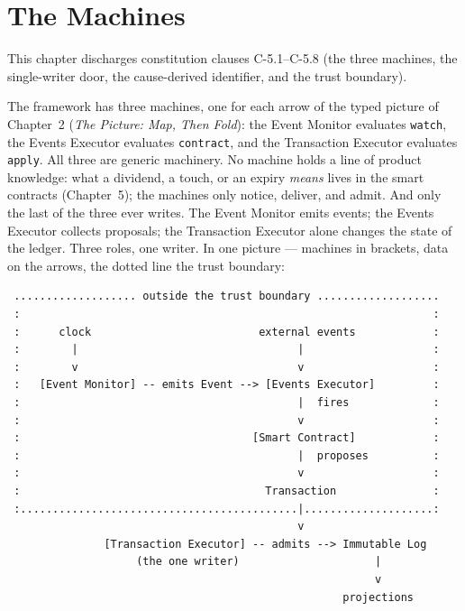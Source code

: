 \section{The Machines}\label{ch:machines}

This chapter discharges constitution clauses C-5.1--C-5.8 (the three machines, the single-writer door, the cause-derived identifier, and the trust boundary).

The framework has three machines, one for each arrow of the typed picture of
Chapter~2 (\emph{The Picture: Map, Then Fold}): the Event Monitor evaluates
\texttt{watch}, the Events Executor evaluates \texttt{contract}, and the
Transaction Executor evaluates \texttt{apply}. All three are generic machinery.
No machine holds a line of product knowledge: what a dividend, a touch, or an
expiry \emph{means} lives in the smart contracts (Chapter~5); the machines only
notice, deliver, and admit. And only the last of the three ever writes. The
Event Monitor emits events; the Events Executor collects proposals; the
Transaction Executor alone changes the state of the ledger. Three roles, one
writer. In one picture --- machines in brackets, data on the arrows, the dotted
line the trust boundary:

{\small
\begin{verbatim}
 ................... outside the trust boundary ...................
 :                                                                :
 :      clock                          external events            :
 :        |                                  |                    :
 :        v                                  v                    :
 :   [Event Monitor] -- emits Event --> [Events Executor]         :
 :                                           |  fires             :
 :                                           v                    :
 :                                    [Smart Contract]            :
 :                                           |  proposes          :
 :                                           v                    :
 :                                      Transaction               :
 :...........................................|....................:
                                             v
               [Transaction Executor] -- admits --> Immutable Log
                    (the one writer)                     |
                                                         v
                                                    projections
\end{verbatim}
}

